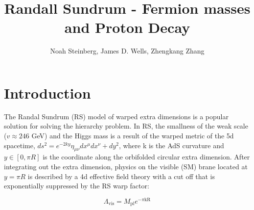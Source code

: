 \documentclass[aps,onecolumn,twoside,secnumarabic,balancelastpage,amsmath,amssymb,nofootinbib,hyperref=pdftex]{revtex4}
\begin{document}
\title{Randall Sundrum - Fermion masses and Proton Decay}
\author         {Noah Steinberg, James D. Wells, Zhengkang Zhang}

\begin{abstract}
\small{}
\end{abstract}

\maketitle

\section{Introduction}
The Randal Sundrum (RS) model of warped extra dimensions is a popular solution for solving the hierarchy problem\cite{RS}. In RS, the smallness of the weak scale ($v \approx 246$ GeV) and the Higgs mass is a result of the warped metric of the 5d spacetime, $ds^{2} = e^{-2ky}\eta_{\mu\nu}dx^{\mu}dx^{\nu} + dy^{2}$, where k is the AdS curvature and $y \in [0,\pi R]$ is the coordinate along the orbifolded circular extra dimension. After integrating out the extra dimension, physics on the visible (SM) brane located at $y = \pi R$ is described by a 4d effective field theory with a cut off that is exponentially suppressed by the RS warp factor:

\begin{equation}
\Lambda_{\text{vis}} = M_{\text{pl}}e^{-\pi \text{kR}}
\end{equation}
\end{document}
